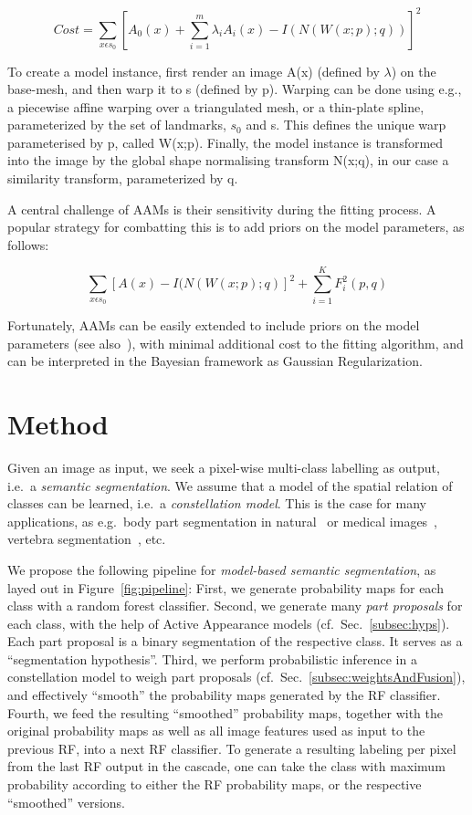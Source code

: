 \documentclass[10pt,twocolumn,letterpaper]{article}
\begin{document}
\[Cost = \sum_{x \epsilon s_0} [A_0(x) + \sum_{i=1}^m \lambda_i A_i(x) - I(N(W(x;p);q))]^2 \]

To create a model instance, first render an image A(x) (defined by $\lambda$) on the base-mesh, and then warp it to s (defined by p).  Warping can be done using e.g., a piecewise affine warping over a triangulated mesh, or a thin-plate spline, parameterized by the set of landmarks, $s_0$ and s.  This defines the unique warp parameterised by p, called W(x;p).  Finally, the model instance is transformed into the image by the global shape normalising transform N(x;q), in our case a similarity transform, parameterized by q.

A central challenge of AAMs is their sensitivity during the fitting process.  A popular strategy for combatting this is to add priors on the model parameters, as follows:

\[ \sum_{x \epsilon s_0} [A(x) - I(N(W(x;p);q)]^2 + \sum_{i=1}^K F_i^2(p,q) \]

Fortunately, AAMs can be easily extended to include priors on the model parameters (see also~\cite{BakerAAM2004}), with minimal additional cost to the fitting algorithm, and can be interpreted in the Bayesian framework as Gaussian Regularization.


\section{Method}
Given an image as input, we seek a pixel-wise multi-class labelling as output, i.e.\ a \emph{semantic segmentation}. 
%
We assume that a model of the spatial relation of classes can be learned, i.e.\ a \emph{constellation model}. This is the case for many applications, as e.g.\ body part segmentation in natural~\cite{PoseMachinesECCV2014} or medical images~\cite{SeifertAnatomicalSPIE2009}, vertebra segmentation~\cite{Glocker2012,Glocker2013}, etc. 
%

We propose the following pipeline for \emph{model-based semantic segmentation}, as layed out in Figure~\ref{fig:pipeline}: 
%
First, we generate probability maps for each class with a random forest classifier.
%
Second, we generate many \emph{part proposals} for each class, with the help of Active Appearance models (cf.\ Sec.\ \ref{subsec:hyps}). 
Each part proposal is a binary segmentation of the respective class. It serves as a ``segmentation hypothesis''. 
%
Third, we perform probabilistic inference in a constellation model to weigh part proposals (cf.\ Sec.\ \ref{subsec:weightsAndFusion}), and effectively ``smooth'' the probability maps generated by the RF classifier.  
%
Fourth, we feed the resulting ``smoothed'' probability maps, together with the original probability maps as well as all image features used as input to the previous RF, into a next RF classifier. 
%
To generate a resulting labeling per pixel from the last RF output in the cascade, one can take the class with maximum probability according to either the RF probability maps, or the respective ``smoothed'' versions. 
\end{document}

